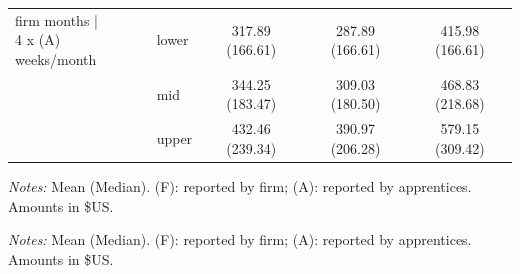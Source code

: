 \documentclass[
  a4paper, twoside, 12pt]{book}
\begin{document}
\begin{singlespacing}
\begin{table}[H]
\begin{threeparttable}
{\begin{tabular}[t]{llccc}
\makecell[l]{firm months |\\ 4 x (A) weeks/month} & lower & 317.89 (166.61) & 287.89 (166.61) & 415.98 (166.61)\\
 & mid & 344.25 (183.47) & 309.03 (180.50) & 468.83 (218.68)\\
 & upper & 432.46 (239.34) & 390.97 (206.28) & 579.15 (309.42)\\
\bottomrule
\end{tabular}}
\begin{tablenotes}
\small
\item \textit{Notes:} Mean (Median). (F): reported by firm; (A): reported by apprentices. Amounts in \$US.
\end{tablenotes}
\end{threeparttable}
\end{table}

\begin{table}[H]

\caption{\label{tab:tbl-allowboundsapp}Allowances per apprentice per year, reported by apprentice}
\centering
\fontsize{9}{11}\selectfont
\begin{threeparttable}
\begin{tablenotes}
\small
\item \textit{Notes:} Mean (Median). (F): reported by firm; (A): reported by apprentices. Amounts in \$US.
\end{tablenotes}
\end{threeparttable}
\end{table}

\end{singlespacing}
\end{document}
